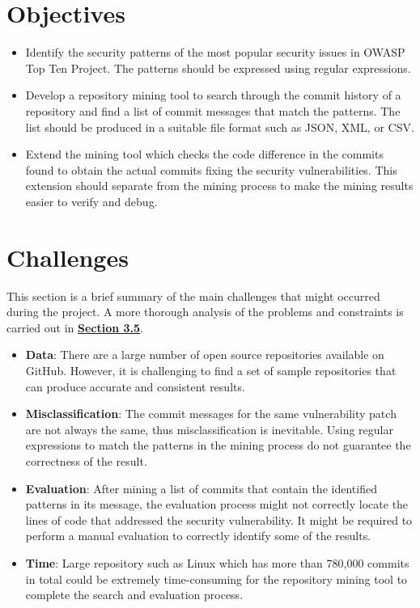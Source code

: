 \documentclass[12pt, a4paper]{report}
\begin{document}
\section{Objectives} \label{sec:objectives}
\begin{itemize}
	\item Identify the security patterns of the most popular security issues in OWASP Top Ten Project.
	The patterns should be expressed using regular expressions.
	\item Develop a repository mining tool to search through the commit history of a repository and
	find a list of commit messages that match the patterns. The list should be produced in a suitable
	file format such as JSON, XML, or CSV.
	\item Extend the mining tool which checks the code difference in the commits found to obtain the
	actual commits fixing the security vulnerabilities. This extension should separate from the mining
	process to make the mining results easier to verify and debug.
\end{itemize}

\section{Challenges} \label{sec:challenges}
This section is a brief summary of the main challenges that might occurred during the project. A
more thorough analysis of the problems and constraints is carried out in
\hyperref[sec:problems_and_constraints]{\textbf{Section 3.5}}.

\begin{itemize}
	\item \textbf{Data}: There are a large number of open source repositories available on GitHub.
	However, it is challenging to find a set of sample repositories that can produce accurate and
	consistent results.
	\item \textbf{Misclassification}: The commit messages for the same vulnerability patch are not
	always the same, thus misclassification is inevitable. Using regular expressions to match the
	patterns in the mining process do not guarantee the correctness of the result.
	\item \textbf{Evaluation}: After mining a list of commits that contain the identified patterns in
	its message, the evaluation process might not correctly locate the lines of code that addressed
	the security vulnerability. It might be required to perform a manual evaluation to correctly
	identify some of the results.
	\item \textbf{Time}: Large repository such as Linux which has more than 780,000 commits in total
	\cite{linux_repo} could be extremely time-consuming for the repository mining tool to complete the
	search and evaluation process.
\end{itemize}
\end{document}

